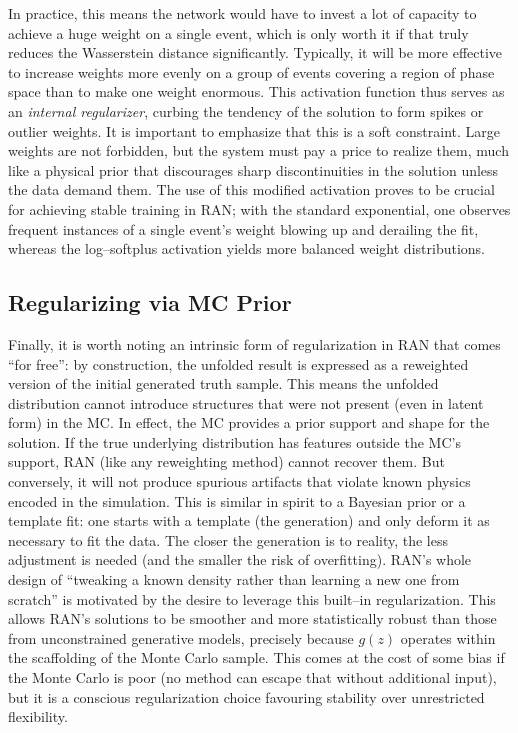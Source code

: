             In practice, this means the network would have to invest a lot of capacity to achieve a huge weight on a single event, which is only worth it if that truly reduces the Wasserstein distance significantly.
            Typically, it will be more effective to increase weights more evenly on a group of events covering a region of phase space than to make one weight enormous.
            This activation function thus serves as an \emph{internal regularizer}, curbing the tendency of the solution to form spikes or outlier weights.
            It is important to emphasize that this is a soft constraint.
            Large weights are not forbidden, but the system must pay a price to realize them, much like a physical prior that discourages sharp discontinuities in the solution unless the data demand them.
            The use of this modified activation proves to be crucial for achieving stable training in RAN; with the standard exponential, one observes frequent instances of a single event’s weight blowing up and derailing the fit, whereas the log--softplus activation yields more balanced weight distributions.
        \subsection{Regularizing via MC Prior}
            Finally, it is worth noting an intrinsic form of regularization in RAN that comes “for free”: by construction, the unfolded result is expressed as a reweighted version of the initial generated truth sample.
            This means the unfolded distribution cannot introduce structures that were not present (even in latent form) in the MC.
            In effect, the MC provides a prior support and shape for the solution.
            If the true underlying distribution has features outside the MC’s support, RAN (like any reweighting method) cannot recover them.
            But conversely, it will not produce spurious artifacts that violate known physics encoded in the simulation.
            This is similar in spirit to a Bayesian prior or a template fit: one starts with a template (the generation) and only deform it as necessary to fit the data.
            The closer the generation is to reality, the less adjustment is needed (and the smaller the risk of overfitting).
            RAN’s whole design of “tweaking a known density rather than learning a new one from scratch” is motivated by the desire to leverage this built--in regularization.
            This allows RAN’s solutions to be smoother and more statistically robust than those from unconstrained generative models, precisely because $g(z)$ operates within the scaffolding of the Monte Carlo sample.
            This comes at the cost of some bias if the Monte Carlo is poor (no method can escape that without additional input), but it is a conscious regularization choice favouring stability over unrestricted flexibility.

